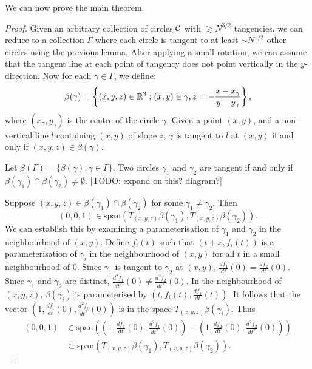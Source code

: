 We can now prove the main theorem.
\begin{proof}
    Given an arbitrary collection of circles $\mathcal C$ with $\gtrsim N^{3/2}$ tangencies, we can reduce to a collection $\Gamma$ where each circle is tangent to at least $\sim N^{1/2}$ other circles using the previous lemma. 
    After applying a small rotation, we can assume that the tangent line at each point of tangency does not point vertically in the $y$-direction.
    Now for each $\gamma \in \Gamma$, we define:
    $$\beta(\gamma) = \left \{ (x,y,z) \in \mathbb R^3 : (x,y) \in \gamma, z = - \frac{x-x_\gamma}{y-y_\gamma} \right \},$$ where $(x_\gamma,y_\gamma)$ is the 
    centre of the circle $\gamma$. Given a point $(x,y)$, and a non-vertical line $l$ containing $(x,y)$ of slope $z$, $\gamma$ is tangent to $l$ at $(x,y)$ if and only if $(x,y,z) \in \beta(\gamma)$.

    Let $\beta (\Gamma) = \{ \beta(\gamma) : \gamma \in \Gamma \}.$ 
    Two circles $\gamma_1$ and $\gamma_2$ are tangent if and only if $\beta(\gamma_1) \cap \beta(\gamma_2) \neq \emptyset$. [TODO: expand on this? diagram?]

    Suppose $(x,y,z) \in \beta(\gamma_1) \cap \beta(\gamma_2) $ for some $\gamma_1 \neq \gamma_2$. Then $$(0,0,1) \in \text{span} \left( T_{(x,y,z) }\beta (\gamma_1), T_{(x,y,z) }\beta (\gamma_2)\right).$$
    We can establish this by examining a parameterisation of $\gamma_1$ and $\gamma_2$ in the neighbourhood of $(x,y)$.
    Define $f_i (t)$ such that $(t+x, f_i(t))$ is a parameterisation of $\gamma_i$ in the neighbourhood of $(x,y)$ for all $t$ in a small neighbourhood of 0. 
    Since $\gamma_1$ is tangent to $\gamma_2$ at $(x,y)$, $\frac{df_1}{dt}(0) = \frac{df_2}{dt}(0)$. 
    Since $\gamma_1$ and $\gamma_2$ are distinct, $\frac{d^2f_1}{dt^2}(0) \neq \frac{d^2f_2}{dt^2}(0)$.
    In the neighbourhood of $(x,y,z)$, $\beta(\gamma_i)$ is parameterised by $\left(t,f_i (t) ,\frac{df_1}{dt}(t) \right)$. It follows that the vector
    $\left(1,\frac{df_i}{dt}(0), \frac{d^2f_i}{dt^2} (0) \right)$ is in the space $T_{(x,y,z)} \beta(\gamma_i)$. Thus 
    \begin{align*} (0,0,1) &\in \text{span}\left( \left(1,\frac{df_1}{dt}(0), \frac{d^2f_1}{dt^2} (0) \right) - \left(1,\frac{df_2}{dt}(0), \frac{d^2f_2}{dt^2} (0) \right) \right)
    \\ &\subset \text{span} \left( T_{(x,y,z) }\beta (\gamma_1), T_{(x,y,z) }\beta (\gamma_2)\right). 
    \end{align*}


\end{proof}
